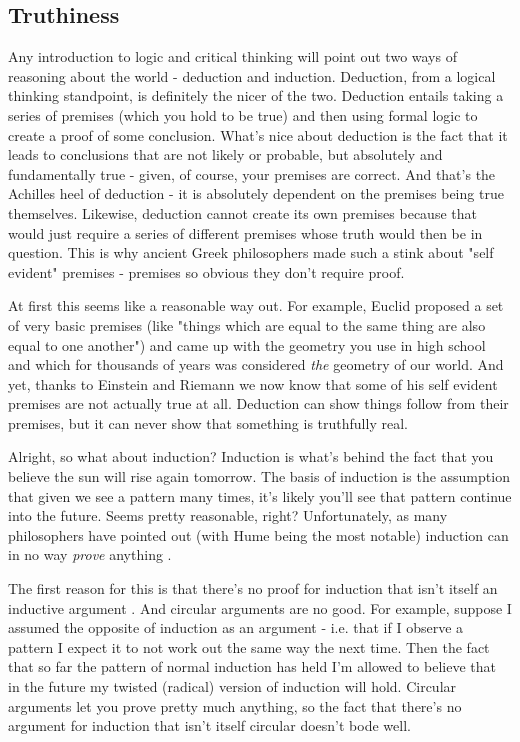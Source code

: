 \documentclass[11pt,a5paper]{book}
\begin{document}
\subsection{Truthiness}
Any introduction to logic and critical thinking will point out two ways of reasoning about the world - deduction and induction. Deduction, from a logical thinking standpoint, is definitely the nicer of the two. Deduction entails taking a series of premises (which you hold to be true) and then using formal logic to create a proof of some conclusion. What's nice about deduction is the fact that it leads to conclusions that are not likely or probable, but absolutely and fundamentally true - given, of course, your premises are correct. And that's the Achilles heel of deduction - it is absolutely dependent on the premises being true themselves. Likewise, deduction cannot create its own premises because that would just require a series of different premises whose truth would then be in question. This is why ancient Greek philosophers made such a stink about "self evident" premises - premises so obvious they don't require proof. 
\newline

At first this seems like a reasonable way out. For example, Euclid proposed a set of very basic premises (like "things which are equal to the same thing are also equal to one another") and came up with the geometry you use in high school and which for thousands of years was considered \textit{the} geometry of our world. And yet, thanks to Einstein and Riemann we now know that some of his self evident premises are not actually true at all. Deduction can show things follow from their premises, but it can never show that something is truthfully real.
\newline

Alright, so what about induction? Induction is what's behind the fact that you believe the sun will rise again tomorrow. The basis of induction is the assumption that given we see a pattern many times, it's likely you'll see that pattern continue into the future. Seems pretty reasonable, right? Unfortunately, as many philosophers have pointed out (with Hume being the most notable) induction can in no way \textit{prove} anything \cite{lipton}.
\newline

The first reason for this is that there's no proof for induction that isn't itself an inductive argument \cite{lipton}. And circular arguments are no good. For example, suppose I assumed the opposite of induction as an argument - i.e. that if I observe a pattern I expect it to not work out the same way the next time. Then the fact that so far the pattern of normal induction has held I'm allowed to believe that in the future my twisted (radical) version of induction will hold. Circular arguments let you prove pretty much anything, so the fact that there's no argument for induction that isn't itself circular doesn't bode well.
\newline
\end{document}
